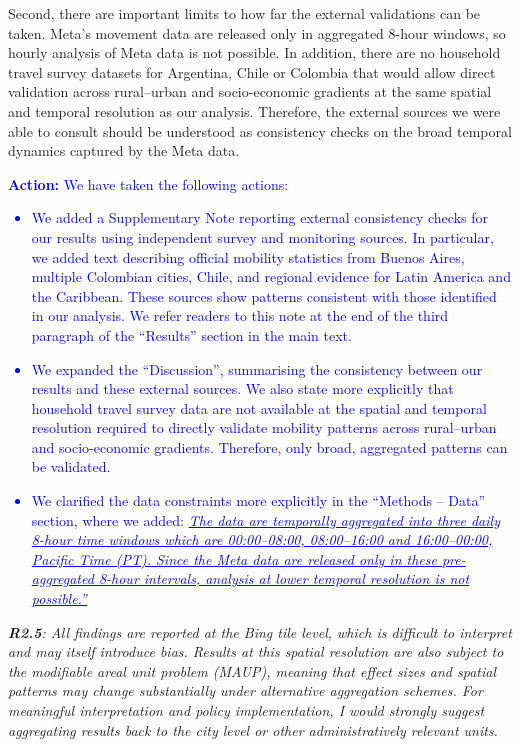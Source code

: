 \documentclass[12pt,a4paper,oneside, reqno]{amsart}
\begin{document}
Second, there are important limits to how far the external validations can be taken. Meta’s movement data are released only in aggregated 8-hour windows, so hourly analysis of Meta data is not possible. In addition, there are no household travel survey datasets for Argentina, Chile or Colombia that would allow direct validation across rural–urban and socio-economic gradients at the same spatial and temporal resolution as our analysis. Therefore, the external sources we were able to consult should be understood as consistency checks on the broad temporal dynamics captured by the Meta data. 

\textcolor{blue}{\textbf{Action:} We have taken the following actions:
\begin{itemize}[noitemsep, topsep=0pt]
    \item We added a Supplementary Note reporting external consistency checks for our results using independent survey and monitoring sources. In particular, we added text describing official mobility statistics from Buenos Aires, multiple Colombian cities, Chile, and regional evidence for Latin America and the Caribbean. These sources show patterns consistent with those identified in our analysis. We refer readers to this note at the end of the third paragraph of the ``Results'' section in the main text.
    \item We expanded the ``Discussion'', summarising the consistency between our results and these external sources. We also state more explicitly that household travel survey data are not available at the spatial and temporal resolution required to directly validate mobility patterns across rural--urban and socio-economic gradients. Therefore, only broad, aggregated patterns can be validated.
    \item We clarified the data constraints more explicitly in the ``Methods -- Data'' section, where we added: \textit{\uline{The data are temporally aggregated into three daily 8-hour time windows which are 00:00--08:00, 08:00--16:00 and 16:00--00:00, Pacific Time (PT). Since the Meta data are released only in these pre-aggregated 8-hour intervals, analysis at lower temporal resolution is not possible.''}}
\end{itemize} }

\setlength{\leftskip}{0cm} \textit{\textbf{R2.5}: All findings are reported at the Bing tile level, which is difficult to interpret and may itself introduce bias. Results at this spatial resolution are also subject to the modifiable areal unit problem (MAUP), meaning that effect sizes and spatial patterns may change substantially under alternative aggregation schemes. For meaningful interpretation and policy implementation, I would strongly suggest aggregating results back to the city level or other administratively relevant units.}
\end{document}
